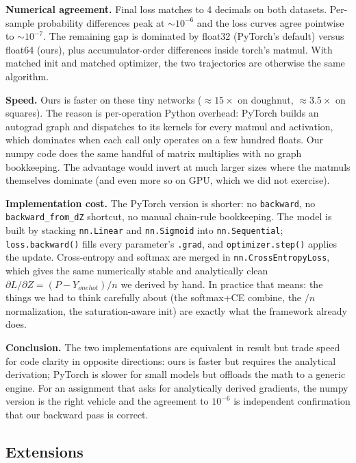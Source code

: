 \documentclass[10pt, a4paper]{article}
\begin{document}
\textbf{Numerical agreement.} Final loss matches to 4 decimals on both datasets. Per-sample probability differences peak at \(\sim 10^{-6}\) and the loss curves agree pointwise to \(\sim 10^{-7}\). The remaining gap is dominated by float32 (PyTorch's default) versus float64 (ours), plus accumulator-order differences inside torch's matmul. With matched init and matched optimizer, the two trajectories are otherwise the same algorithm.

\textbf{Speed.} Ours is faster on these tiny networks (\(\approx 15\times\) on doughnut, \(\approx 3.5\times\) on squares). The reason is per-operation Python overhead: PyTorch builds an autograd graph and dispatches to its kernels for every matmul and activation, which dominates when each call only operates on a few hundred floats. Our numpy code does the same handful of matrix multiplies with no graph bookkeeping. The advantage would invert at much larger sizes where the matmuls themselves dominate (and even more so on GPU, which we did not exercise).

\textbf{Implementation cost.} The PyTorch version is shorter: no \texttt{backward}, no \texttt{backward\_from\_dZ} shortcut, no manual chain-rule bookkeeping. The model is built by stacking \texttt{nn.Linear} and \texttt{nn.Sigmoid} into \texttt{nn.Sequential}; \texttt{loss.backward()} fills every parameter's \texttt{.grad}, and \texttt{optimizer.step()} applies the update. Cross-entropy and softmax are merged in \texttt{nn.CrossEntropyLoss}, which gives the same numerically stable and analytically clean \(\partial L/\partial Z = (P - Y_{onehot})/n\) we derived by hand. In practice that means: the things we had to think carefully about (the softmax+CE combine, the \(/n\) normalization, the saturation-aware init) are exactly what the framework already does.

\textbf{Conclusion.} The two implementations are equivalent in result but trade speed for code clarity in opposite directions: ours is faster but requires the analytical derivation; PyTorch is slower for small models but offloads the math to a generic engine. For an assignment that asks for analytically derived gradients, the numpy version is the right vehicle and the agreement to \(10^{-6}\) is independent confirmation that our backward pass is correct.

\subsection{Extensions}
\end{document}
